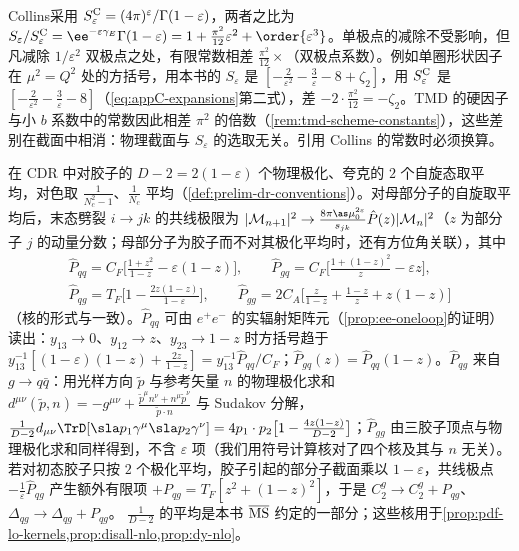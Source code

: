 \begin{remark}\label{rem:appC-Seps}
Collins\cite{Collins2011}采用 $S^{\rm C}_\varepsilon=(4\pi)^\varepsilon/\Gamma(1-\varepsilon)$，两者之比为 $S_\varepsilon/S^{\rm C}_\varepsilon=\ee^{-\varepsilon\gamma_E}\Gamma(1-\varepsilon)=1+\frac{\pi^2}{12}\varepsilon^2+\order{\varepsilon^3}$。单极点的减除不受影响，但凡减除 $1/\varepsilon^2$ 双极点之处，有限常数相差 $\frac{\pi^2}{12}\times$（双极点系数）。例如单圈形状因子在 $\mu^2=Q^2$ 处的方括号，用本书的 $S_\varepsilon$ 是 $[-\frac2{\varepsilon^2}-\frac3\varepsilon-8+\zeta_2]$，用 $S^{\rm C}_\varepsilon$ 是 $[-\frac2{\varepsilon^2}-\frac3\varepsilon-8]$（\cref{eq:appC-expansions}第二式），差 $-2\cdot\frac{\pi^2}{12}=-\zeta_2$。TMD 的硬因子与小 $b$ 系数中的常数因此相差 $\pi^2$ 的倍数（\cref{rem:tmd-scheme-constants}），这些差别在截面中相消：物理截面与 $S_\varepsilon$ 的选取无关。引用 Collins 的常数时必须换算。
\end{remark}

\begin{remark}[$D$ 维劈裂核与平均约定]\label{rem:appC-d-kernels}
在 CDR 中对胶子的 $D-2=2(1-\varepsilon)$ 个物理极化、夸克的 $2$ 个自旋态取平均，对色取 $\frac1{N_c^2-1}$、$\frac1{N_c}$ 平均（\cref{def:prelim-dr-conventions}）。对母部分子的自旋取平均后，末态劈裂 $i\to jk$ 的共线极限为 $|\mathcal M_{n+1}|^2\to\frac{8\pi\as\mu_0^{2\varepsilon}}{s_{jk}}\hat P(z)|\mathcal M_n|^2$（$z$ 为部分子 $j$ 的动量分数；母部分子为胶子而不对其极化平均时，还有方位角关联），其中
\begin{equation}\label{eq:appC-kernels}
\begin{gathered}
\hat P_{qq}=C_F\Big[\frac{1+z^2}{1-z}-\varepsilon(1-z)\Big],\qquad
\hat P_{gq}=C_F\Big[\frac{1+(1-z)^2}z-\varepsilon z\Big],\\
\hat P_{qg}=T_F\Big[1-\frac{2z(1-z)}{1-\varepsilon}\Big],\qquad
\hat P_{gg}=2C_A\Big[\frac z{1-z}+\frac{1-z}z+z(1-z)\Big]
\end{gathered}
\end{equation}
（核的形式与\cite{CataniSeymour1997}一致）。$\hat P_{qq}$ 可由 $e^+e^-$ 的实辐射矩阵元（\cref{prop:ee-oneloop}的证明）读出：$y_{13}\to0$、$y_{12}\to z$、$y_{23}\to1-z$ 时方括号趋于 $y_{13}^{-1}[(1-\varepsilon)(1-z)+\frac{2z}{1-z}]=y_{13}^{-1}\hat P_{qq}/C_F$；$\hat P_{gq}(z)=\hat P_{qq}(1-z)$。$\hat P_{qg}$ 来自 $g\to q\bar q$：用光样方向 $\tilde p$ 与参考矢量 $n$ 的物理极化求和 $d^{\mu\nu}(\tilde p,n)=-g^{\mu\nu}+\frac{\tilde p^\mu n^\nu+n^\mu\tilde p^\nu}{\tilde p\cdot n}$ 与 Sudakov 分解，$\frac1{D-2}d_{\mu\nu}\TrD[\sla p_1\gamma^\mu\sla p_2\gamma^\nu]=4p_1\cdot p_2\big[1-\frac{4z(1-z)}{D-2}\big]$；$\hat P_{gg}$ 由三胶子顶点与物理极化求和同样得到，不含 $\varepsilon$ 项（我们用符号计算核对了四个核及其与 $n$ 无关）。若对初态胶子只按 $2$ 个极化平均，胶子引起的部分子截面乘以 $1-\varepsilon$，共线极点 $-\frac1\varepsilon\hat P_{qg}$ 产生额外有限项 $+P_{qg}=T_F[z^2+(1-z)^2]$，于是 $C_2^g\to C_2^g+P_{qg}$、$\Delta_{qg}\to\Delta_{qg}+P_{qg}$。%
$\frac1{D-2}$ 的平均是本书 $\overline{\rm MS}$ 约定的一部分；这些核用于\cref{prop:pdf-lo-kernels,prop:disall-nlo,prop:dy-nlo}。
\end{remark}

